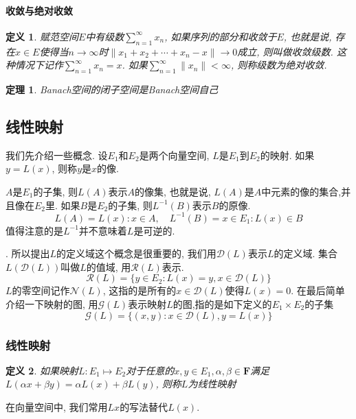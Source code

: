 \documentclass[a4paper,11pt]{article}
\newtheorem{definition}{\hspace{2em}定义}[section]
\newtheorem{theorem}{\hspace{2em}定理}[section]
\begin{document}
\paragraph*{收敛与绝对收敛}
\begin{definition}
  赋范空间$E$中有级数$\sum_{n=1}^{\infty}x_n$, 如果序列的部分和收敛于$E$, 也就是说, 存在$x\in E$使得当$n\to\infty$时$\|x_1+x_2+\cdots+x_n-x\|\to0$成立, 则叫做收敛级数. 这种情况下记作$\sum_{n=1}^{\infty}x_n=x$. 如果$\sum_{n=1}^{\infty}\|x_n\|<\infty$, 则称级数为绝对收敛.
\end{definition}
\begin{theorem}
  Banach空间的闭子空间是Banach空间自己
\end{theorem}
\subsection{线性映射}
我们先介绍一些概念. 设$E_1$和$E_2$是两个向量空间, $L$是$E_1$到$E_2$的映射. 如果$y=L(x)$, 则称$y$是$x$的像.

$A$是$E_1$的子集, 则$L(A)$表示$A$的像集, 也就是说, $L(A)$是$A$中元素的像的集合,并且像在$E_2$里. 如果$B$是$E_2$的子集, 则$L^{-1}(B)$表示$B$的原像.
\begin{equation*}
  L(A)={L(x):x\in A},\quad L^{-1}(B)={x\in E_1:L(x)\in B}
\end{equation*}
值得注意的是$L^{-1}$并不意味着$L$是可逆的.

. 所以提出$L$的定义域这个概念是很重要的, 我们用$\mathcal{D}(L)$表示$L$的定义域. 集合$L(\mathcal{D}(L))$叫做$L$的值域, 用$\mathcal{R}(L)$表示.
\begin{equation*}
  \mathcal{R}(L)=\{y\in E_2:L(x)=y,x\in\mathcal{D}(L)\}
\end{equation*}
$L$的零空间记作$\mathcal{N}(L)$, 这指的是所有的$x\in \mathcal{D}(L)$使得$L(x)=0$. 在最后简单介绍一下映射的图, 用$\mathcal{G}(L)$表示映射$L$的图,指的是如下定义的$E_1\times E_2$的子集
\begin{equation*}
  \mathcal{G}(L)=\{(x,y):x\in\mathcal{D}(L),y=L(x)\}
\end{equation*}
\subsubsection*{线性映射}
\begin{definition}
  如果映射$L:E_1\mapsto E_2$对于任意的$x,y\in E_1,\alpha,\beta\in \mathbf{F}$满足$L(\alpha x+\beta y)=\alpha L(x)+\beta L(y)$, 则称$L$为线性映射
\end{definition}
在向量空间中, 我们常用$Lx$的写法替代$L(x)$.
\end{document}
